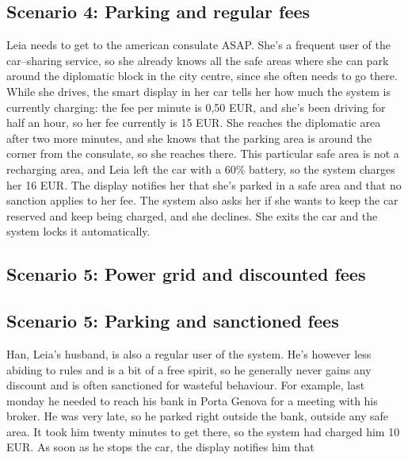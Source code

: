 \subsection{Scenario 4: Parking and regular fees}
	Leia needs to get to the american consulate ASAP. She's a frequent user of the car–sharing service, so she already knows all the safe areas where she can park around the diplomatic block in the city centre, since she often needs to go there. While she drives, the smart display in her car tells her how much the system is currently charging: the fee per minute is 0,50 EUR, and she's been driving for half an hour, so her fee currently is 15 EUR. She reaches the diplomatic area after two more minutes, and she knows that the parking area is around the corner from the consulate, so she reaches there. This particular safe area is not a recharging area, and Leia left the car with a 60\% battery, so the system charges her 16 EUR. The display notifies her that she's parked in a safe area and that no sanction applies to her fee. The system also asks her if she wants to keep the car reserved and keep being charged, and she declines. She exits the car and the system locks it automatically. 
	
\subsection{Scenario 5: Power grid and discounted fees}
	
\subsection{Scenario 5: Parking and sanctioned fees}
	Han, Leia's husband, is also a regular user of the system. He's however less abiding to rules and is a bit of a free spirit, so he generally never gains any discount and is often sanctioned for wasteful behaviour. For example, last monday he needed to reach his bank in Porta Genova for a meeting with his broker. He was very late, so he parked right outside the bank, outside any safe area. It took him twenty minutes to get there, so the system had charged him 10 EUR. As soon as he stops the car, the display notifies him that 